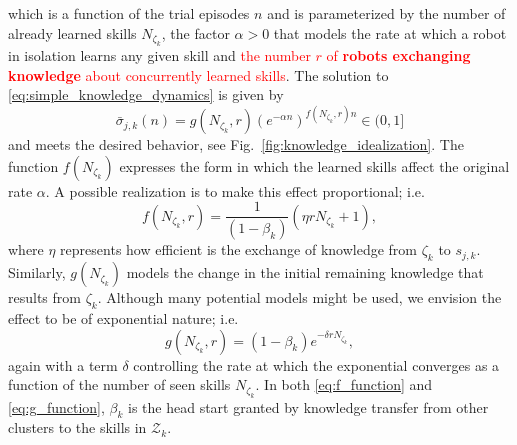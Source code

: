 which is a function of the trial episodes $n$ and is parameterized by the number of already learned skills $N_{\zeta_k}$, the factor $ \alpha>0$ that models the rate at which a robot in isolation learns any given skill and \textcolor{red}{the number $r$ of \textbf{robots exchanging knowledge} about concurrently learned skills}. The solution to \eqref{eq:simple_knowledge_dynamics} is given by
\begin{equation}\label{eq:knowledge_exponential_form}
	\boxed{\bar{\sigma}_{j,k}(n) = g\left(N_{\zeta_k}, r\right) \left(e^{- \alpha  n}\right) ^{f\left(N_{\zeta_k}, r\right) n} \in (0,1]}
\end{equation}
and meets the desired behavior, see Fig.~\ref{fig:knowledge_idealization}. The function $f\left(N_{\zeta_k}\right)$ expresses the form in which the learned skills affect the original rate $\alpha$. A possible realization is to make this effect proportional; i.e.
\begin{equation}\label{eq:f_function}
	f\left(N_{\zeta_k},r\right) = \frac{1}{(1 - \beta_k)}\left( \eta r N_{\zeta_k} + 1 \right),
\end{equation}
where $\eta$ represents how efficient is the exchange of knowledge from $\zeta_k$ to $s_{j,k}$. Similarly, $g\left(N_{\zeta_k}\right)$ models the change in the initial remaining knowledge that results from $\zeta_k$. Although many potential models might be used, we envision the effect to be of exponential nature; i.e.
\begin{equation}\label{eq:g_function}
	g\left(N_{\zeta_k},r\right) = (1-\beta_k) e^{-\delta r N_{\zeta_k}},
\end{equation}
again with a term $\delta$ controlling the rate at which the exponential converges as a function of the number of seen skills $N_{\zeta_k}$. In both \eqref{eq:f_function} and \eqref{eq:g_function},   $\beta_k$ is the head start granted by knowledge transfer from other clusters to the skills in $\mathcal{Z}_k$.
